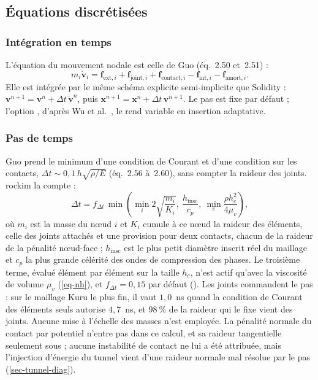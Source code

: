 \subsection{Équations discrétisées}
\label{sec-discret}

\subsubsection{Intégration en temps}

L'équation du mouvement nodale est celle de Guo (éq.~{2.50} et~{2.51}) :
\begin{equation}
m_i \dot{\mathbf v}_i = \mathbf f_{\text{ext},i} + \mathbf f_{\text{joint},i} + \mathbf f_{\text{contact},i} - \mathbf f_{\text{int},i} - \mathbf f_{\text{amort},i} .
\label{eq-mvt}
\end{equation}
Elle est intégrée par le même schéma explicite semi-implicite que Solidity : $\mathbf v^{n+1} = \mathbf v^n + \Delta t\,\dot{\mathbf v}^n$, puis $\mathbf x^{n+1} = \mathbf x^n + \Delta t\,\mathbf v^{n+1}$. Le pas est fixe par défaut ; l'option , d'après Wu et al.~\cite{wu2024dt}, le rend variable en insertion adaptative.

\subsubsection{Pas de temps}

Guo prend le minimum d'une condition de Courant et d'une condition sur les contacts, $\Delta t \sim 0{,}1\,h\sqrt{\rho/E}$ (éq.~{2.56} à~{2.60}), sans compter la raideur des joints. rockim la compte :
\begin{equation}
\Delta t = f_{\Delta t} \, \min\left( \min_i 2\sqrt{\frac{m_i}{K_i}},\ \frac{h_\text{insc}}{c_p},\ \min_e \frac{\rho h_e^2}{4\mu_v} \right),
\label{eq-dt}
\end{equation}
où $m_i$ est la masse du nœud $i$ et $K_i$ cumule à ce nœud la raideur des éléments, celle des joints attachés et une provision pour deux contacts, chacun de la raideur de la pénalité nœud-face ; $h_\text{insc}$ est le plus petit diamètre inscrit réel du maillage et $c_p$ la plus grande célérité des ondes de compression des phases. Le troisième terme, évalué élément par élément sur la taille $h_e$, n'est actif qu'avec la viscosité de volume $\mu_v$ (\cref{eq-nh}), et $f_{\Delta t} = 0{,}15$ par défaut (). Les joints commandent le pas : sur le maillage Kuru le plus fin, il vaut $1{,}0$~ns quand la condition de Courant des éléments seuls autorise $4{,}7$~ns, et $98~\%$ de la raideur qui le fixe vient des joints. Aucune mise à l'échelle des masses n'est employée. La pénalité normale du contact par potentiel n'entre pas dans ce calcul, et sa raideur tangentielle seulement sous  ; aucune instabilité de contact ne lui a été attribuée, mais l'injection d'énergie du tunnel vient d'une raideur normale mal résolue par le pas (\cref{sec-tunnel-diag}).

